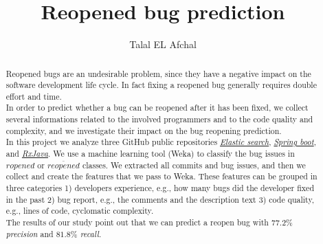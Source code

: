 \documentclass[sigconf,review]{acmart}
\begin{document}
\title{Reopened bug prediction }
\author{Talal EL Afchal}

\begin{abstract}
Reopened bugs are an undesirable problem, since they have a negative impact on the software development life cycle. In fact fixing a reopened bug generally requires double effort and time.\\
In order to predict whether a bug can be reopened after it has been fixed, we collect several informations related to the involved programmers and to the code quality and complexity, and we investigate their impact on the bug reopening prediction. \\
In this project we analyze three GitHub public repositories  \href{https://github.com/elastic/elasticsearch}{\emph{Elastic search}}, \href{https://github.com/spring-projects/spring-boot}{\emph{Spring boot}}, and \href{https://github.com/ReactiveX/RxJava}{\emph{RxJava}}. We use a machine learning tool (Weka) to classify the bug issues in $ropened$ or $\overline{reopened}$ classes. We extracted all commits and bug issues, and then we collect and create the features that we pass to Weka. These features can be grouped in three categories 1) developers experience, e.g., how many bugs did the developer fixed in the past 2) bug report, e.g., the comments and the description text  3) code quality, e.g., lines of code, cyclomatic complexity.\\
The results of our study point out that we can predict a reopen bug with $77.2\%$ \emph{precision} and $81.8\%$ \emph{recall}.
\end{abstract}

\maketitle
\end{document}

